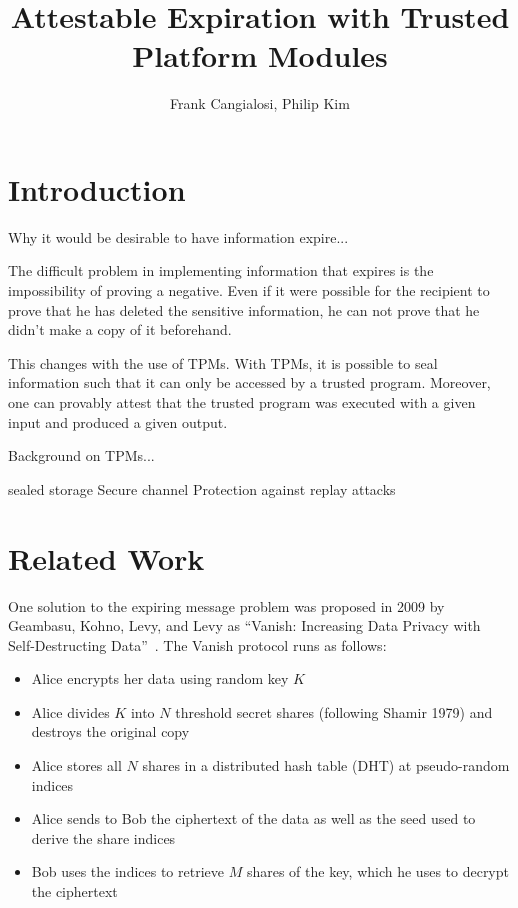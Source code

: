\documentclass{article}
\begin{document}
\title{Attestable Expiration with Trusted Platform Modules}
\author{Frank Cangialosi, Philip Kim}

\maketitle

\section{Introduction}

Why it would be desirable to have information expire...

The difficult problem in implementing information that expires is the impossibility of proving a negative. Even if it were possible for the recipient to prove that he has deleted the sensitive information, he can not prove that he didn't make a copy of it beforehand.

This changes with the use of TPMs. With TPMs, it is possible to seal information such that it can only be accessed by a trusted program. Moreover, one can provably attest that the trusted program was executed with a given input and produced a given output.

Background on TPMs...

sealed storage
Secure channel
Protection against replay attacks


\section{Related Work}

One solution to the expiring message problem was proposed in 2009 by Geambasu, Kohno, Levy, and Levy as ``Vanish: Increasing Data Privacy with Self-Destructing Data''~\cite{vanish}. The Vanish protocol runs as follows:

\begin{itemize}
\item Alice encrypts her data using random key $K$
\item Alice divides $K$ into $N$ threshold secret shares (following Shamir 1979) and destroys the original copy
\item Alice stores all $N$ shares in a distributed hash table (DHT) at pseudo-random indices
\item Alice sends to Bob the ciphertext of the data as well as the seed used to derive the share indices
\item Bob uses the indices to retrieve $M$ shares of the key, which he uses to decrypt the ciphertext
\end{itemize}
\end{document}
